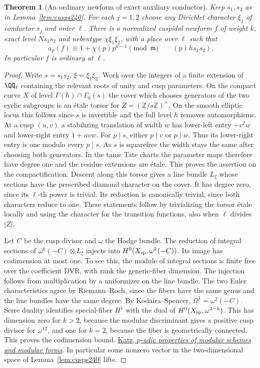 \documentclass[a4paper,11pt]{article}
\newtheorem{theorem}[proposition]{Theorem}
\theoremstyle{definition}
\theoremstyle{remark}
\newcommand{\ZZ}{\mathbb Z}\newcommand{\ord}{\operatorname{ord}}
\numberwithin{equation}{section}
\begin{document}
\begin{theorem}[An ordinary newform of exact auxiliary conductor]
\label{thm:eigen240}
Keep \(s_1,s_2\) as in Lemma~\ref{lem:cusps240}.
For each \(j=1,2\) choose any Dirichlet character \(\xi_j\) of
conductor \(s_j\) and order \(\ell\). There is a normalized
cuspidal newform \(f\) of weight \(k\), exact level \(Ns_1s_2\)
and nebentype \(\chi\xi_1\xi_2\), with a place over \(\ell\) such that
\[
       a_p(f)\equiv 1+\chi(p)p^{k-1}\pmod{\mathfrak m}
                              \qquad(p\nmid h s_1s_2).
\]
In particular \(f\) is ordinary at \(\ell\).
\end{theorem}
\begin{proof}
Write \(s=s_1s_2\), \(\xi=\xi_1\xi_2\).
Work over the integers of a finite extension of \(\QQ_\ell\)
containing the relevant roots of unity and cusp parameters.
On the compact curve \(X\) of level \(\Gamma(h)\cap\Gamma_0(s)\)
the cover which chooses generators of the two cyclic subgroups
is an \'etale torsor for \(Z=(\ZZ/s\ZZ)^\times\).
On the smooth elliptic locus this follows since \(s\) is
invertible and the full level \(h\) removes automorphisms.
At a cusp \((u,v)\) a stabilizing translation of width \(w\)
has lower-left entry \(-v^2w\) and lower-right entry \(1+uvw\).
For \(p\mid s\), either \(p\mid v\) or \(p\mid w\).
Thus its lower-right entry is one modulo every \(p\mid s\).
As \(s\) is squarefree the width stays the same after choosing
both generators. In the tame Tate charts the parameter maps
therefore have degree one and the residue extensions are
\'etale. This proves the assertion on the compactification.
Descent along this torsor gives a line bundle \(L_\xi\) whose
sections have the prescribed diamond character on the cover.
It has degree zero, since its \(\ell\)-th power is trivial.
Its reduction is canonically trivial, since both characters
reduce to one. These statements follow by trivializing the
torsor \'etale locally and using the character for the transition
functions, also when \(\ell\) divides \(|Z|\).

Let \(C\) be the cusp divisor and \(\omega\) the Hodge bundle.
The reduction of integral sections of \(\omega^k(-C)\otimes L_\xi\)
injects into \(H^0(X_{\rm sp},\omega^k(-C))\). Its image has
codimension at most one. To see this, the module of integral
sections is finite free over the coefficient DVR, with rank
the generic-fiber dimension. The injection follows from
multiplication by a uniformizer on the line bundle. The two
Euler characteristics agree by Riemann--Roch, since the fibers
have the same genus and the line bundles have the same degree.
By Kodaira--Spencer, \(\Omega^1=\omega^2(-C)\). Serre duality
identifies special-fiber \(H^1\) with the dual of
\(H^0(X_{\rm sp},\omega^{2-k})\). This has dimension zero
for \(k>2\), because the modular discriminant gives a positive
cusp divisor for \(\omega^{12}\), and one for \(k=2\),
because the fiber is geometrically connected. This proves the
codimension bound.
\href{https://web.math.princeton.edu/~nmk/old/padicpropMFMS.pdf}{Katz,
\emph{\(p\)-adic properties of modular schemes and modular forms}}.
In particular some nonzero vector in the
two-dimensional space of Lemma~\ref{lem:cusps240} lifts.


\end{proof}
\end{document}
